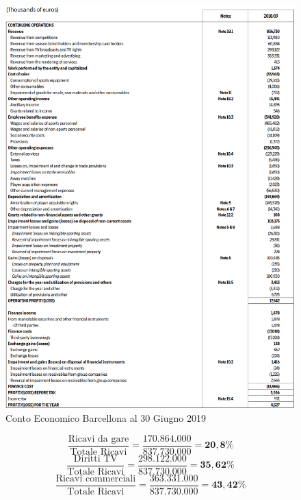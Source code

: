\documentclass[
    corpo=12pt,
    oneside,
    evenboxes,
    tipotesi=triennale,
    stile=classica,
    oldstyle,
    autoretitolo,
    greek,
]{toptesi}
\begin{document}
\begin{interlinea}{1.5}
\begin{enumerate}
\begin{figure}
            \includegraphics[scale=.5]{img/CE_barca.png}
            \caption{Conto Economico Barcellona al 30 Giugno 2019}
            \label{ce_barca}
        \end{figure}\newline
        \begin{equation}
            \frac{\text{Ricavi da gare}}{\text{Totale Ricavi}} = \frac{170.864.000}{837.730.000} = \mathbf{20,8\%}
            \label{eqn: gare_barca}
        \end{equation}
        \begin{equation}
            \frac{\text{Diritti TV}}{\text{Totale Ricavi}} = \frac{298.122.000}{837.730.000} = \mathbf{35,62\%}
            \label{eqn: tv_barca}
        \end{equation}
        \begin{equation}
            \frac{\text{Ricavi commerciali}}{\text{Totale Ricavi}} = \frac{363.331.000}{837.730.000} = \mathbf{43,42\%}

\end{equation}
\end{enumerate}
\end{interlinea}
\end{document}
